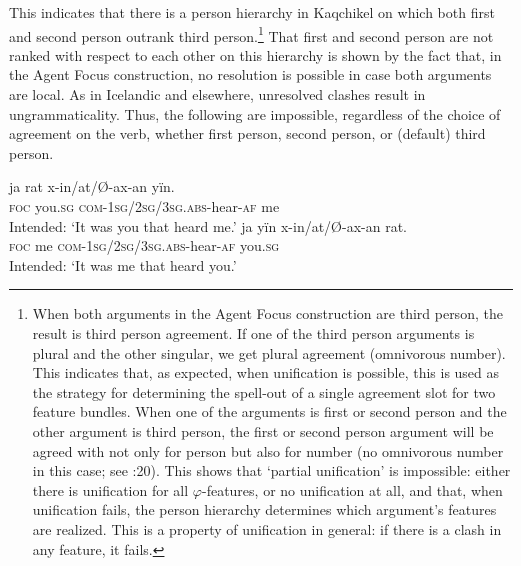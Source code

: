 \documentclass[output=paper]{langsci/langscibook}
\begin{document}
This indicates that there is a person hierarchy in Kaqchikel on which both first and second person outrank third person.\footnote{When both arguments in the Agent Focus construction are third person, the result is third person agreement. If one of the third person arguments is plural and the other singular, we get plural agreement (omnivorous number). This indicates that, as expected, when unification is possible, this is used as the strategy for determining the spell-out of a single agreement slot for two feature bundles. When one of the arguments is first or second person and the other argument is third person, the first or second person argument will be agreed with not only for person but also for number (no omnivorous number in this case; see \citealt{Preminger2014}:20). This shows that ‘partial unification’ is impossible: either there is unification for all $\varphi $-features, or no unification at all, and that, when unification fails, the person hierarchy determines which argument’s features are realized. This is a property of unification in general: if there is a clash in any feature, it fails.} That first and second person are not ranked with respect to each other on this hierarchy is shown by the fact that, in the Agent Focus construction, no resolution is possible in case both arguments are local. As in Icelandic and elsewhere, unresolved clashes result in ungrammaticality. Thus, the following are impossible, regardless of the choice of agreement on the verb, whether first person, second person, or (default) third person.

\ea 
\ea
\gll *ja   rat        x-in/at/Ø-ax-an                          yïn.\\
      \textsc{foc} you.\textsc{sg} \textsc{com-1sg/2sg/3sg.abs}{}-hear-\textsc{af} me\\
\glt Intended: ‘It was you that heard me.’
\ex
\gll *ja    yïn x-in/at/Ø-ax-an                           rat.\\
     \textsc{foc} me \textsc{com-1sg/2sg/3sg.abs}{}-hear-\textsc{af} you.\textsc{sg}\\
\glt    Intended: ‘It was me that heard you.’
\z
\z
\end{document}
